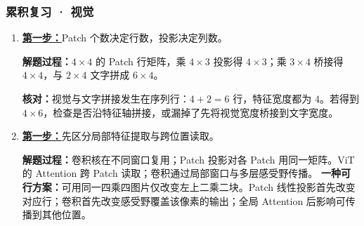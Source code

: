 \subsubsection*{累积复习 · 视觉}
\begin{enumerate}[label={},leftmargin=4.8em,itemsep=4pt]
\item[\textbf{R-15.}] \leavevmode{}\label{solution:R-15}\label{solution:review-image-token-shapes}\hyperref[exercise:review-image-token-shapes]{\textbf{第一步：}}Patch 个数决定行数，投影决定列数。\par\nobreak\textbf{解题过程：}$4\times4$ 的 Patch 行矩阵，乘 $4\times3$ 投影得 $4\times3$；乘 $3\times4$ 桥接得 $4\times4$，与 $2\times4$ 文字拼成 $6\times4$。\par\textbf{核对：}视觉与文字拼接发生在序列行：$4+2=6$ 行，特征宽度都为 $4$。若得到 $4\times6$，检查是否沿特征轴拼接，或漏掉了先将视觉宽度桥接到文字宽度。
\item[\textbf{R-16.}] \leavevmode{}\label{solution:R-16}\label{solution:review-vision-sharing}\hyperref[exercise:review-vision-sharing]{\textbf{第一步：}}先区分局部特征提取与跨位置读取。\par\nobreak\textbf{解题过程：}卷积核在不同窗口复用；Patch 投影对各 Patch 用同一矩阵。ViT 的 Attention 跨 Patch 读取；卷积通过局部窗口与多层感受野传播。
\textbf{一种可行方案：}可用同一四乘四图片仅改变左上二乘二块。Patch 线性投影首先改变对应行；卷积首先改变感受野覆盖该像素的输出；全局 Attention 后影响可传播到其他位置。
\end{enumerate}
